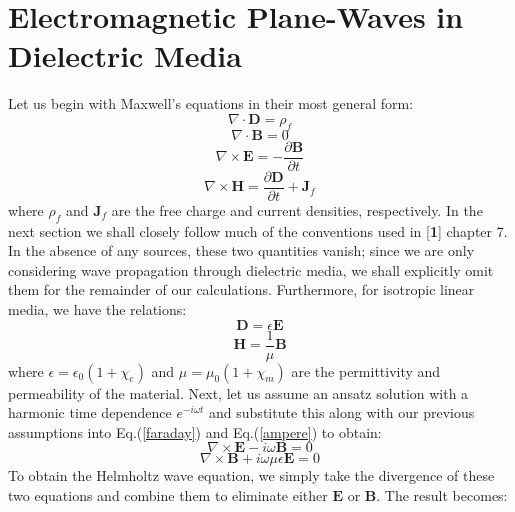 \documentclass[preprint, onecolumn, amsmath, amssymb, aps]{revtex4-1}
\numberwithin{equation}{section}
\begin{document}
\section{Electromagnetic Plane-Waves in Dielectric Media}
Let us begin with Maxwell's equations in their most general form:
\begin{equation}
\nabla \cdot \mathbf{D} = \rho_{f}
\end{equation}
\begin{equation}
\nabla \cdot \mathbf{B} = 0
\end{equation}
\begin{equation}\label{faraday}
\nabla \times \mathbf{E} = - \frac{\partial \mathbf{B}}{\partial t}
\end{equation}
\begin{equation}\label{ampere}
\nabla \times \mathbf{H} =  \frac{\partial \mathbf{D}}{\partial t} + \mathbf{J}_{f}
\end{equation}
\noindent
where $\rho_{f}$ and $\mathbf{J}_{f}$ are the free charge and current densities, respectively. In the next section we shall closely follow much of the conventions used in [\textbf{1}] chapter 7. In the absence of any sources, these two quantities vanish; since we are only considering wave propagation through dielectric media, we shall explicitly omit them for the remainder of our calculations. Furthermore, for isotropic linear media, we have the  relations: \\
\begin{equation}
\mathbf{D} = \epsilon \mathbf{E}
\end{equation}
\begin{equation}
\mathbf{H} = \frac{1}{\mu} \mathbf{B}
\end{equation}
\noindent
where $\epsilon = \epsilon_{0} (1 + \chi_{e})$ and $\mu = \mu_{0} (1 + \chi_{m})$ are the permittivity and permeability of the material. Next, let us assume an ansatz solution with a harmonic time dependence $e^{- i \omega t}$ and substitute this along with our previous assumptions into Eq.(\ref{faraday}) and Eq.(\ref{ampere}) to obtain:
\begin{equation}
\nabla \times \mathbf{E} - i \omega \mathbf{B} = 0
\end{equation}
\begin{equation}
\nabla \times \mathbf{B} + i \omega \mu \epsilon \mathbf{E} = 0
\end{equation}
\noindent
To obtain the Helmholtz wave equation, we simply take the divergence of these two equations and combine them to eliminate either $\mathbf{E}$ or $\mathbf{B}$. The result becomes:
\end{document}
